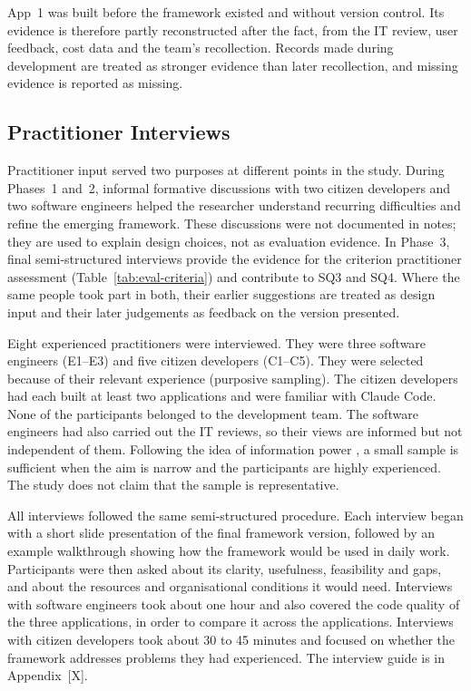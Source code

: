 \documentclass[10pt,a4paper]{article}
\begin{document}
App~1 was built before the framework existed and without version
control. Its evidence is therefore partly reconstructed after the
fact, from the IT review, user feedback, cost data and the team's
recollection. Records made during development are treated as stronger
evidence than later recollection, and missing evidence is reported as
missing.


\subsection{Practitioner Interviews}
\label{sec:method-interviews}
 
Practitioner input served two purposes at different points in the
study. During Phases~1 and~2, informal formative discussions with two
citizen developers and two software engineers helped the researcher
understand recurring difficulties and refine the emerging framework.
These discussions were not documented in notes; they are used to
explain design choices, not as evaluation evidence. In Phase~3, final
semi-structured interviews provide the evidence for the criterion
practitioner assessment (Table~\ref{tab:eval-criteria}) and contribute
to SQ3 and SQ4. Where the same people took part in both, their earlier
suggestions are treated as design input and their later judgements as
feedback on the version presented.

Eight experienced practitioners were interviewed. They were three
software engineers (E1--E3) and five citizen developers (C1--C5). They
were selected because of their relevant experience (purposive
sampling). The citizen developers had each built at least two
applications and were familiar with Claude Code. None of the
participants belonged to the development team. The software engineers
had also carried out the IT reviews, so their views are informed but
not independent of them. Following the idea of information power
\parencite{malterud2016informationpower}, a small sample is sufficient
when the aim is narrow and the participants are highly experienced.
The study does not claim that the sample is representative.

All interviews followed the same semi-structured procedure. Each
interview began with a short slide presentation of the final framework
version, followed by an example walkthrough showing how the framework
would be used in daily work. Participants were then asked about its
clarity, usefulness, feasibility and gaps, and about the resources and
organisational conditions it would need. Interviews with software
engineers took about one hour and also covered the code quality of the
three applications, in order to compare it across the applications.
Interviews with citizen developers took about 30 to 45 minutes and
focused on whether the framework addresses problems they had
experienced. The interview guide is in Appendix~[X].
\end{document}
